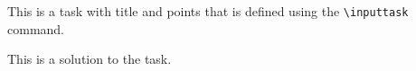 This is a task with title and points that is defined using the \texttt{\textbackslash inputtask} command.

\begin{solution}
    This is a solution to the task.
\end{solution}
